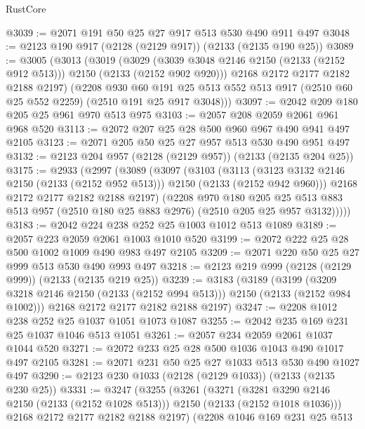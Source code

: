 \begin{lexlean}{RustCore}
\begin{coremodule}
@3039 := @2071 @191 @50 @25 @27 @917 @513 @530 @490 @911 @497
@3048 := @2123 @190 @917 (@2128 (@2129 @917)) (@2133 (@2135 @190 @25))
@3089 := @3005
    (@3013
      (@3019
        (@3029 (@3039 @3048 @2146 @2150 (@2133 (@2152 @912 @513))) @2150 (@2133 (@2152 @902 @920)))
        @2168
        @2172
        @2177
        @2182
        @2188
        @2197)
      (@2208
        @930
        @60
        @191
        @25
        @513
        @552
        @513
        @917
        (@2510 @60 @25 @552 @2259)
        (@2510 @191 @25 @917 @3048)))
@3097 := @2042 @209 @180 @205 @25 @961 @970 @513 @975
@3103 := @2057 @208 @2059 @2061 @961 @968 @520
@3113 := @2072 @207 @25 @28 @500 @960 @967 @490 @941 @497 @2105
@3123 := @2071 @205 @50 @25 @27 @957 @513 @530 @490 @951 @497
@3132 := @2123 @204 @957 (@2128 (@2129 @957)) (@2133 (@2135 @204 @25))
@3175 := @2933
    (@2997
      (@3089
        (@3097
          (@3103
            (@3113
              (@3123 @3132 @2146 @2150 (@2133 (@2152 @952 @513)))
              @2150
              (@2133 (@2152 @942 @960)))
            @2168
            @2172
            @2177
            @2182
            @2188
            @2197)
          (@2208
            @970
            @180
            @205
            @25
            @513
            @883
            @513
            @957
            (@2510 @180 @25 @883 @2976)
            (@2510 @205 @25 @957 @3132)))))
@3183 := @2042 @224 @238 @252 @25 @1003 @1012 @513 @1089
@3189 := @2057 @223 @2059 @2061 @1003 @1010 @520
@3199 := @2072 @222 @25 @28 @500 @1002 @1009 @490 @983 @497 @2105
@3209 := @2071 @220 @50 @25 @27 @999 @513 @530 @490 @993 @497
@3218 := @2123 @219 @999 (@2128 (@2129 @999)) (@2133 (@2135 @219 @25))
@3239 := @3183
    (@3189
      (@3199 (@3209 @3218 @2146 @2150 (@2133 (@2152 @994 @513))) @2150 (@2133 (@2152 @984 @1002)))
      @2168
      @2172
      @2177
      @2182
      @2188
      @2197)
@3247 := @2208 @1012 @238 @252 @25 @1037 @1051 @1073 @1087
@3255 := @2042 @235 @169 @231 @25 @1037 @1046 @513 @1051
@3261 := @2057 @234 @2059 @2061 @1037 @1044 @520
@3271 := @2072 @233 @25 @28 @500 @1036 @1043 @490 @1017 @497 @2105
@3281 := @2071 @231 @50 @25 @27 @1033 @513 @530 @490 @1027 @497
@3290 := @2123 @230 @1033 (@2128 (@2129 @1033)) (@2133 (@2135 @230 @25))
@3331 := @3247
    (@3255
      (@3261
        (@3271
          (@3281 @3290 @2146 @2150 (@2133 (@2152 @1028 @513)))
          @2150
          (@2133 (@2152 @1018 @1036)))
        @2168
        @2172
        @2177
        @2182
        @2188
        @2197)
      (@2208
        @1046
        @169
        @231
        @25
        @513

\end{coremodule}
\end{lexlean}
